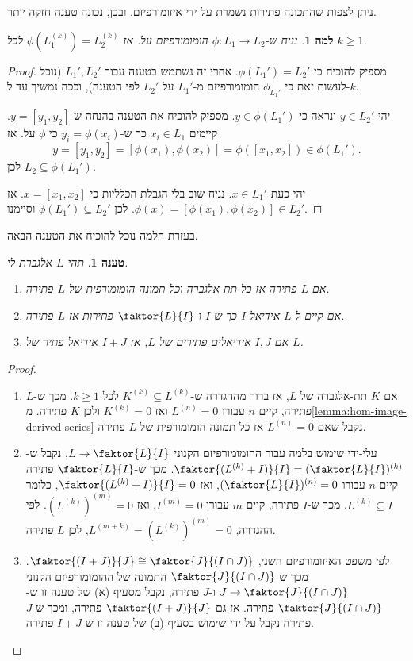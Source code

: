 \documentclass{report}
\theoremstyle{break}
\newtheorem{lemma}[lemma]{למה}
\newtheorem{preposition}[preposition]{טענה}
\theoremstyle{MyNonumberbreak}
\newtheorem{proof}{הוכחה}
\begin{document}
ניתן לצפות שהתכונה פתירות נשמרת על-ידי איזומורפיזם. ובכן, נכונה טענה חזקה יותר.
\begin{lemma} \label{lemma:hom-image-derived-series}
	נניח ש-$\phi : L_1 \to L_2$ הומומורפיזם על. אז $\phi(L_1^{(k)}) = L_2^{(k)}$ לכל $k \ge 1$.
\end{lemma}
\begin{proof}
מספיק להוכיח כי $\phi(L_1') = L_2'$. אחרי זה נשתמש בטענה עבור $L_1', L_2'$ (נוכל לעשות זאת כי $\phi_{L_1'}$ הומומורפיזם מ-$L_1'$ על $L_2'$ לפי הטענה), וככה נמשיך עד ל-$k$.

יהי $y \in L_2'$ ונראה כי $y \in \phi(L_1')$. מספיק להוכיח את הטענה בהנחה ש-$y = [y_1, y_2]$. קיימים $x_i \in L_1$ כך ש-$y_i = \phi(x_i)$ כי $\phi$ על. אז
\[ y = [y_1, y_2] = [\phi(x_1), \phi(x_2)] = \phi([x_1, x_2]) \in \phi(L_1'). \]
לכן $L_2 \subseteq \phi(L_1')$.

יהי כעת $x \in L_1'$. נניח שוב בלי הגבלת הכלליות כי $x = [x_1, x_2]$. אז $\phi(x) = [\phi(x_1), \phi(x_2)] \in L_2'$. לכן $\phi(L_1') \subseteq L_2'$ וסיימנו.
\end{proof}
בעזרת הלמה נוכל להוכיח את הטענה הבאה.
\begin{preposition} \label{prep:solvable}
	תהי $L$ אלגברת לי.
	\begin{enumerate}[label=(\alph*)]
		\item 
		אם $L$ פתירה אז כל תת-אלגברה וכל תמונה הומומורפית של $L$ פתירה.
		\item
		אם קיים ל-$L$ אידיאל $I$ כך ש-$I$ ו-$\faktor{L}{I}$ פתירות אז $L$ פתירה.
		\item
		אם $I, J$ אידיאלים פתירים של $L$, אז $I + J$ אידיאל פתיר של $L$.
	\end{enumerate}
\end{preposition}
\begin{proof}
	\begin{enumerate}[label=(\alph*)]
		\item 
		אם $K$ תת-אלגברה של $L$, אז ברור מההגדרה ש-$K^{(k)} \subseteq L^{(k)}$ לכל $k \ge 1$. מכך ש-$L$ פתירה, קיים $n$ עבורו $L^{(n)} = 0$ ואז $K^{(k)} = 0$ ולכן $K$ פתירה. מ\autoref*{lemma:hom-image-derived-series} נקבל שאם $L^{(n)} = 0$ אז כל תמונה הומומורפית של $L$ פתירה.
		\item
		עלי-ידי שימוש בלמה עבור ההומומורפיזם הקנוני $L \to \faktor{L}{I}$, נקבל ש-$\faktor{(L^{(k)}+I)}{I} = (\faktor{L}{I})^{(k)}$. מכך ש-$\faktor{L}{I}$ פתירה קיים $n$ עבורו $(\faktor{L}{I})^{(n)} = 0$, ואז $\faktor{(L^{(k)}+I)}{I} = 0$, כלומר $L^{(k)} \subseteq I$. מכך ש-$I$ פתירה, קיים $m$ עבורו $I^{(m)} = 0$, ואז $(L^{(k)})^{(m)} = 0$. לפי ההגדרה, $L^{(m+k)} = (L^{(k)})^{(m)} = 0$, לכן $L$ פתירה.
		\item
		לפי משפט האיזומורפיזם השני, $\faktor{(I+J)}{J} \cong \faktor{J}{(I \cap J)}$. מכך ש-$\faktor{J}{(I \cap J)}$ התמונה של ההומומורפיזם הקנוני $J \to \faktor{J}{(I \cap J)}$ ו-$J$ פתירה, נקבל מסעיף (א) של טענה זו ש-$\faktor{J}{(I \cap J)}$ פתירה. אז גם $\faktor{(I+J)}{J}$ פתירה, ומכך ש-$J$ פתירה נקבל על-ידי שימוש בסעיף (ב) של טענה זו ש-$I + J$ פתירה.
	\end{enumerate}
\end{proof}
\end{document}
